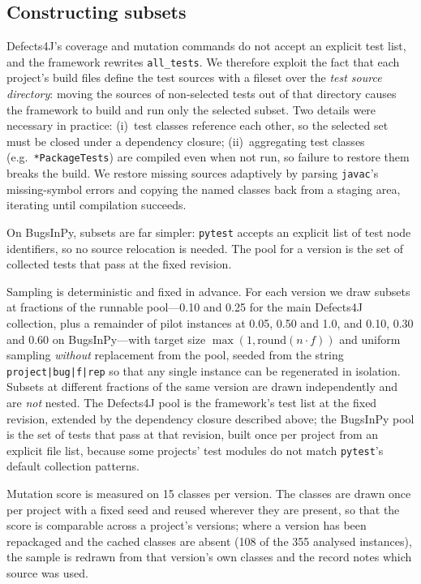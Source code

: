 \documentclass[preprint,12pt]{elsarticle}
\begin{document}
\subsection{Constructing subsets}
\label{sec:subsets}

Defects4J's coverage and mutation commands do not accept an explicit test
list, and the framework rewrites \texttt{all\_tests}. We therefore exploit
the fact that each project's build files define the test sources with a
fileset over the \emph{test source directory}: moving the sources of
non-selected tests out of that directory causes the framework to build and
run only the selected subset. Two details were necessary in practice:
(i)~test classes reference each other, so the selected set must be closed
under a dependency closure; (ii)~aggregating test classes
(e.g.\ \texttt{*PackageTests}) are compiled even when not run, so failure
to restore them breaks the build. We restore missing sources adaptively by
parsing \texttt{javac}'s missing-symbol errors and copying the named
classes back from a staging area, iterating until compilation succeeds.

On BugsInPy, subsets are far simpler: \texttt{pytest} accepts an explicit
list of test node identifiers, so no source relocation is needed. The pool
for a version is the set of collected tests that pass at the fixed revision.

Sampling is deterministic and fixed in advance. For each version we draw
subsets at fractions of the runnable pool---\num{0.10} and \num{0.25} for
the main Defects4J collection, plus a remainder of pilot instances at
\num{0.05}, \num{0.50} and \num{1.0}, and \num{0.10}, \num{0.30} and
\num{0.60} on BugsInPy---with target size $\max(1, \mathrm{round}(n \cdot
f))$ and uniform sampling \emph{without} replacement from the pool, seeded
from the string \texttt{project|bug|f|rep} so that any single instance can be
regenerated in isolation. Subsets at different fractions of the same version
are drawn independently and are \emph{not} nested. The Defects4J pool is the
framework's test list at the fixed revision, extended by the dependency
closure described above; the BugsInPy pool is the set of tests that pass at
that revision, built once per project from an explicit file list, because
some projects' test modules do not match \texttt{pytest}'s default
collection patterns.

Mutation score is measured on \num{15} classes per version. The classes are
drawn once per project with a fixed seed and reused wherever they are
present, so that the score is comparable across a project's versions; where
a version has been repackaged and the cached classes are absent
(\num{108} of the \num{355} analysed instances), the sample is redrawn from
that version's own classes and the record notes which source was used.
\end{document}
